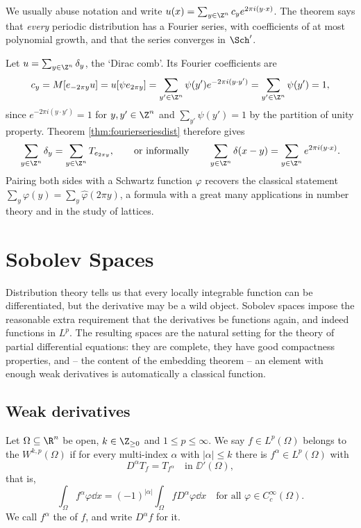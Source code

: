 We usually abuse notation and write $u(x)=\sum_{y\in\Z^n}c_ye^{2\pi i(y\cdot x)}$. The theorem says that \emph{every} periodic distribution has a Fourier series, with coefficients of at most polynomial growth, and that the series converges in $\Sch'$.

\begin{example}
	Let $u=\sum_{y\in\Z^n}\delta_y$, the `Dirac comb'. Its Fourier coefficients are
	$$c_y=M[e_{-2\pi y}u]=u[\psi e_{2\pi y}]=\sum_{y'\in\Z^n}\psi(y')e^{-2\pi i(y\cdot y')}=\sum_{y'\in\Z^n}\psi(y')=1,$$
	since $e^{-2\pi i (y \cdot y')}=1$ for $y,y'\in\Z^n$ and $\sum_{y'}\psi(y')=1$ by the partition of unity property. Theorem \ref{thm:fourierseriesdist} therefore gives 
	$$\sum_{y\in\Z^n}\delta_y = \sum_{y\in\Z^n}T_{e_{2\pi y}}, \qquad \text{or informally} \qquad \sum_{y\in\Z^n}\delta(x-y)=\sum_{y\in\Z^n}e^{2\pi i (y\cdot x)}.$$
	Pairing both sides with a Schwartz function $\varphi$ recovers the classical statement $\sum_{y}\varphi(y)=\sum_y\hat\varphi(2\pi y)$, a formula with a great many applications in number theory and in the study of lattices.
\end{example}

\section{Sobolev Spaces}\label{sec:sobolev}

Distribution theory tells us that every locally integrable function can be differentiated, but the derivative may be a wild object. Sobolev spaces impose the reasonable extra requirement that the derivatives be functions again, and indeed functions in $L^p$. The resulting spaces are the natural setting for the theory of partial differential equations: they are complete, they have good compactness properties, and -- the content of the embedding theorem -- an element with enough weak derivatives is automatically a classical function.

\subsection{Weak derivatives}

\begin{definition}
	Let $\Omega\subseteq\R^n$ be open, $k\in\Z_{\ge0}$ and $1\le p\le\infty$. We say $f \in L^p(\Omega)$ belongs to the  $W^{k,p}(\Omega)$ if for every multi-index $\alpha$ with $|\alpha|\le k$ there is $f^\alpha\in L^p(\Omega)$ with
	$$D^\alpha T_f = T_{f^\alpha} \quad\text{in }\DD'(\Omega),$$
	that is,
	$$\int_\Omega f^\alpha\varphi\dd x = (-1)^{|\alpha|}\int_\Omega fD^\alpha\varphi\dd x \quad\text{for all }\varphi\in C_c^\infty(\Omega).$$
	We call $f^\alpha$ the  of $f$, and write $D^\alpha f$ for it.
\end{definition}

